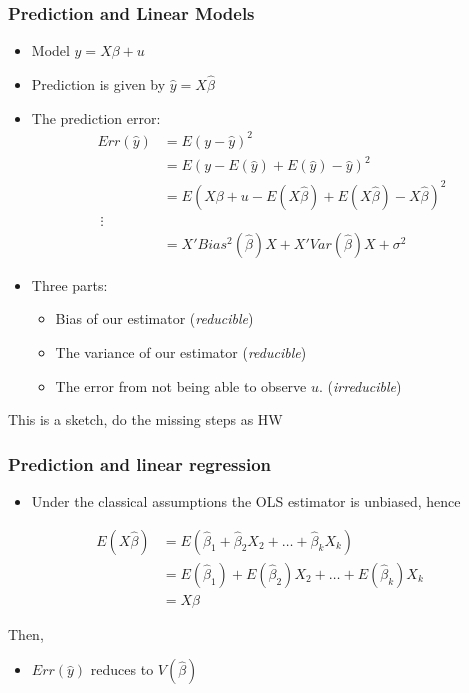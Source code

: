 \documentclass[
  shownotes,
  xcolor={svgnames},
  hyperref={colorlinks,citecolor=DarkBlue,linkcolor=DarkRed,urlcolor=DarkBlue}
  , aspectratio=169]{beamer}
\begin{document}
\begin{frame}
\frametitle{Prediction and Linear Models}

\begin{itemize}
\item Model $y = X\beta + u$
\item Prediction is given by $\hat{y} = X\hat{\beta}$
\item The prediction error:
\begin{align}
Err(\hat y) &= E\left(y-\hat y\right)^2 \\  
        &= E\left(y- E(\hat y) + E(\hat y) - \hat y\right)^2  \\
        &= E\left(X\beta + u- E(X\hat{\beta}) + E(X\hat{\beta}) - X\hat{\beta} \right)^2  \\\
        \vdots \\
        &= X' Bias^2\left(\hat \beta \right)X +  X'Var( \hat \beta)X  + \sigma^2
\end{align}
\item Three parts:
\begin{itemize}
  \item  Bias of our estimator (\emph{reducible})
  \item  The variance of our estimator (\emph{reducible})
  \item  The error from not being able to observe $u$. (\emph{irreducible})
\end{itemize}

\end{itemize}
\medskip
{\tiny This is a sketch, do the missing steps as HW}

\end{frame}

\begin{frame}
\frametitle{Prediction and linear regression}

\begin{itemize}
  \item Under the classical assumptions the OLS estimator is unbiased, hence 
\end{itemize}

\begin{align}
  E( X \hat \beta)&= E(\hat{\beta}_1 + \hat{\beta}_2 X_2 + \dots + \hat{\beta}_k X_k) \\ 
  &= E(\hat{\beta}_1) + E(\hat{\beta}_2) X_2 + \dots + E(\hat{\beta}_k) X_k  \\ 
  &= X \beta
\end{align}


Then, 

\begin{itemize}
  \item $Err(\hat y)$ reduces to  $V(\hat \beta)$
\end{itemize} 


\end{frame}
\end{document}
